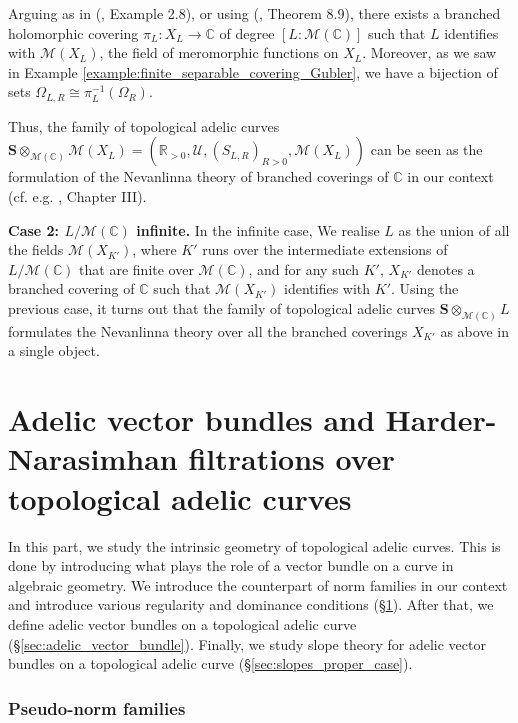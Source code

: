 \documentclass [11pt,reqno]{amsart}
\def\bC{{\mathbb{C}}}
\def\bR{{\mathbb{R}}}
\newcommand{\1}{\mathmybb{1}}
\def\cM{{\mathcal{M}}}
\def\cU{{\mathcal{U}}}
\begin{document}
Arguing as in (\cite{Gubler97}, Example 2.8), or using (\cite{Forster81}, Theorem 8.9), there exists a branched holomorphic covering $\pi_{L} : X_{L} \to \bC$ of degree $[L:\cM(\bC)]$ such that $L$ identifies with $\cM(X_{L})$, the field of meromorphic functions on $X_{L}$. Moreover, as we saw in Example \ref{example:finite_separable_covering_Gubler}, we have a bijection of sets $\Omega_{L,R}\cong\pi_{L}^{-1}(\Omega_{R})$.

Thus, the family of topological adelic curves $\mathbf{S}\otimes_{\cM(\bC)}\cM(X_{L})=(\bR_{>0},\cU,(S_{L,R})_{R>0},\cM(X_{L}))$ can be seen as the formulation of the Nevanlinna theory of branched coverings of $\bC$ in our context (cf. e.g. \cite{LangCherry90}, Chapter III).

\textbf{Case 2: $L/\cM(\bC)$ infinite.} In the infinite case, We realise $L$ as the union of all the fields $\cM(X_{K'})$, where $K'$ runs over the intermediate extensions of $L/\cM(\bC)$ that are finite over $\cM(\bC)$, and for any such $K'$, $X_{K'}$ denotes a branched covering of $\bC$ such that $\cM(X_{K'})$ identifies with $K'$. Using the previous case, it turns out that the family of topological adelic curves $\mathbf{S}\otimes_{\cM(\bC)} L$ formulates the Nevanlinna theory over all the branched coverings $X_{K'}$ as above in a single object. 
 
\part{Adelic vector bundles and Harder-Narasimhan filtrations over topological adelic curves}
\label{part:geometry_of_numbers}

In this part, we study the intrinsic geometry of topological adelic curves. This is done by introducing what plays the role of a vector bundle on a curve in algebraic geometry. We introduce the counterpart of norm families in our context and introduce various regularity and dominance conditions (\S \ref{sec:pseudo-norm_families}). After that, we define adelic vector bundles on a topological adelic curve (\S \ref{sec:adelic_vector_bundle}). Finally, we study slope theory for adelic vector bundles on a topological adelic curve (\S \ref{sec:slopes_proper_case}). %

\section{Pseudo-norm families}
\label{sec:pseudo-norm_families}
\end{document}
